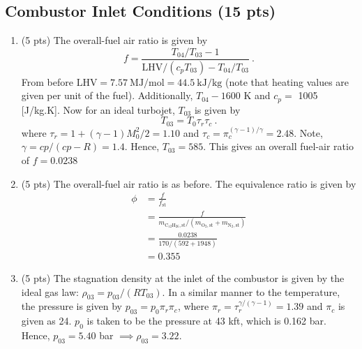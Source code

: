 \documentclass[12pt]{article}
\newcommand{\dod}{\mathrm{C}_{12}\mathrm{H}_{26}}
\newcommand{\nit}{\mathrm{N}_{2}}
\newcommand{\ox}{\mathrm{O}_{2}}
\begin{document}
	\subsection{Combustor Inlet Conditions (15 pts)}
		\begin{enumerate}[label=(\arabic*)]
			\item (5 pts)
				The overall-fuel air ratio is given by
				\begin{equation}
					f = \frac{T_{04}/T_{03}-1}{\mathrm{LHV}/(c_pT_{03})-T_{04}/T_{03}}\ .
				\end{equation}
				From before $\mathrm{LHV}=7.57\ \mathrm{MJ/mol}=44.5\ \mathrm{kJ/kg}$ (note that heating values are given per unit of the fuel). Additionally, $T_{04}-1600$ K and $c_p=$ 1005 [J/kg.K]. Now for an ideal turbojet, $T_{03}$ is given by
				\begin{equation}
					T_{03}=T_0\tau_{r}\tau_{c}\ .
				\end{equation}
				where $\tau_r=1+(\gamma-1)M_0^2/2=1.10$ and $\tau_c=\pi_c^{(\gamma-1)/\gamma}=2.48$. Note, $\gamma=cp/(cp-R)=1.4$. Hence, $T_{03}=585$. This gives an overall fuel-air ratio of $\boxed{f=0.0238}$
			\item (5 pts)
				The overall-fuel air ratio is as before. The equivalence ratio is given by 
				\begin{equation}
					\begin{aligned}
						\phi&=\frac{f}{f_\mathrm{st}}\\
							&=\frac{f}{m_{\dod,\mathrm{st}}/\left(m_{\ox,\mathrm{st}}+m_{\nit,\mathrm{st}}\right)}\\
							&=\frac{0.0238}{170/(592+1948)}\\
							&=\boxed{0.355}
					\end{aligned}
				\end{equation}
			\item (5 pts)
				The stagnation density at the inlet of the combustor is given by the ideal gas law: $\rho_{03}=p_{03}/(RT_{03})$. In a similar manner to the temperature, the pressure is given by $p_{03}=p_0\pi_r\pi_c$, where $\pi_r=\tau_r^{\gamma/(\gamma-1)}=1.39$ and $\pi_c$ is given as 24. $p_0$ is taken to be the pressure at 43 kft, which is 0.162 bar. Hence, $p_{03}=5.40$ bar $\implies \boxed{\rho_{03}=3.22}$. 
		\end{enumerate}
\end{document}
